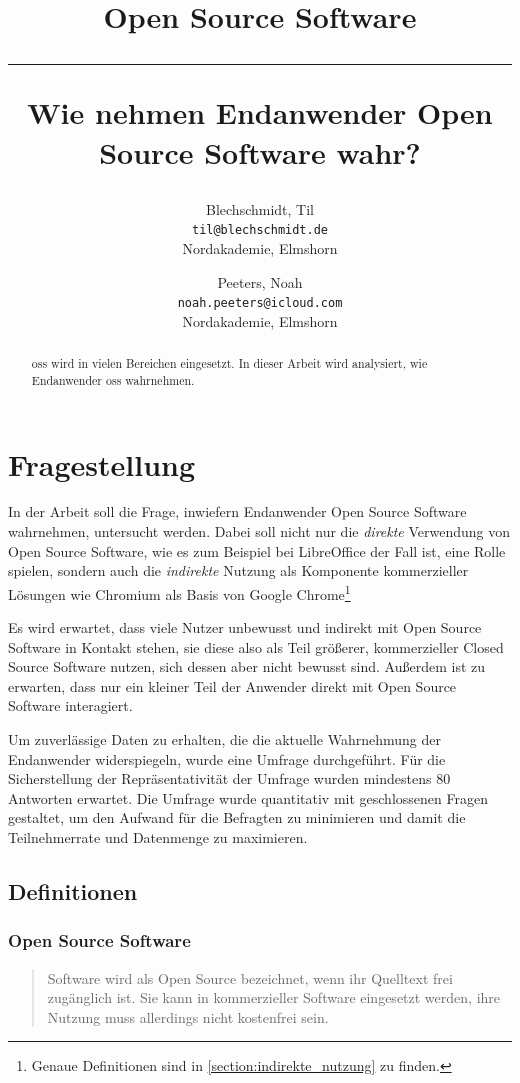 \documentclass[a4paper]{article}
\title{Open Source Software \\
    \noindent\rule[0.25ex]{\linewidth}{0.5pt}
    \large Wie nehmen Endanwender Open Source Software wahr?
}
\author{
  Blechschmidt, Til\\
  \texttt{til@blechschmidt.de}\\
  Nordakademie, Elmshorn
  \and
  Peeters, Noah\\
  \texttt{noah.peeters@icloud.com}\\
  Nordakademie, Elmshorn
}
\begin{document}
    \thispagestyle{fancy}
    \maketitle

    \clearpage
    \begin{abstract}
         \gls{oss} wird in vielen Bereichen eingesetzt. In dieser Arbeit wird analysiert, wie Endanwender \gls{oss} wahrnehmen.
    \end{abstract}
    \newpage

    \tableofcontents
    \listoffigures
    \listoftables
    \clearpage

    
                    
    \section{Fragestellung}
        In der Arbeit soll die Frage, inwiefern Endanwender Open Source Software wahrnehmen, untersucht werden. Dabei soll nicht nur die \emph{direkte} Verwendung von Open Source Software, wie es zum Beispiel bei LibreOffice der Fall ist, eine Rolle spielen, sondern auch die \emph{indirekte} Nutzung als Komponente kommerzieller Lösungen wie Chromium als Basis von Google Chrome\footnote{Genaue Definitionen sind in \ref{section:indirekte_nutzung} zu finden.}
		
		Es wird erwartet, dass viele Nutzer unbewusst und indirekt mit Open Source Software in Kontakt stehen, sie diese also als Teil größerer, kommerzieller Closed Source Software nutzen, sich dessen aber nicht bewusst sind. Außerdem ist zu erwarten, dass nur ein kleiner Teil der Anwender direkt mit Open Source Software interagiert\cite{oss:lotus-to-linux}.
		
		Um zuverlässige Daten zu erhalten, die die aktuelle Wahrnehmung der Endanwender widerspiegeln, wurde eine Umfrage durchgeführt. Für die Sicherstellung der Repräsentativität der Umfrage wurden mindestens 80 Antworten erwartet.
		Die Umfrage wurde quantitativ mit geschlossenen Fragen gestaltet, um den Aufwand für die Befragten zu minimieren und damit die Teilnehmerrate und Datenmenge zu maximieren. %
		
		\subsection{Definitionen} %
            \subsubsection{Open Source Software}
                \begin{quote} 
                    \centering 
                    Software wird als Open Source bezeichnet, wenn ihr Quelltext frei zugänglich ist. Sie kann in kommerzieller Software eingesetzt werden, ihre Nutzung muss allerdings nicht kostenfrei sein. 
                \end{quote}
                
\end{document}
